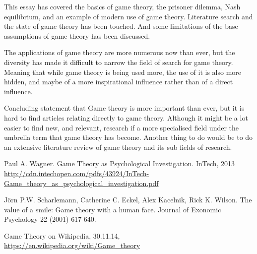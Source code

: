 \documentclass[12pt, a4paper]{article}
\begin{document}
This essay has covered the basics of game theory, the prisoner dilemma, Nash
equilibrium, and an example of modern use of game theory. Literature search and
the state of game theory has been touched. And some limitations of the base
assumptions of game theory has been discussed. 

The applications of game theory are more numerous now than ever, but the
diversity has made it difficult to narrow the field of search for game theory.
Meaning that while game theory is being used more, the use of it is also more
hidden, and maybe of a more inspirational influence rather than of a direct
influence. 

Concluding statement that Game theory is more important than ever, but it is
hard to find articles relating directly to game theory. Although it might be a
lot easier to find new, and relevant, research if a more specialised field
under the umbrella term that game theory has become. Another thing to do would
be to do an extensive literature review of game theory and its sub fields of
research.  


\begin{thebibliography}{1}

Paul A. Wagner. Game Theory as Psychological Investigation. InTech, 2013
\url{http://cdn.intechopen.com/pdfs/43924/InTech-Game_theory_as_psychological_investigation.pdf}

Jörn P.W. Scharlemann, Catherine C. Eckel, Alex Kacelnik, Rick K. Wilson. The
value of a smile: Game theory with a human face. Journal of Exonomic Psychology
22 (2001) 617-640. 

Game Theory on Wikipedia, 30.11.14,
\url{https://en.wikipedia.org/wiki/Game_theory}

\end{thebibliography}
\end{document}
